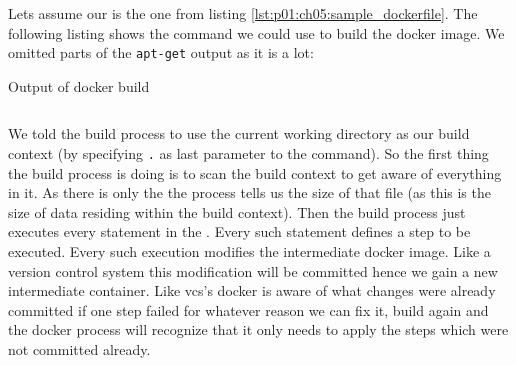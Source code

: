			Lets assume our \dockerfile{} is the one from listing \ref{lst:p01:ch05:sample_dockerfile}. The following listing shows the command we could use to build the docker image. We omitted parts of the \texttt{apt-get} output as it is a lot:
			\begin{listing}[H]
				\caption{Output of docker build}
				\label{lst:p01:ch05:docker_build}
				\inputminted{text}{\relative{chapter_04/section_5.1.2/docker_build.lst}}
			\end{listing}
			We told the build process to use the current working directory as our build context (by specifying \texttt{.} as last parameter to the command). So the first thing the build process is doing is to scan the build context to get aware of everything in it. As there is only the \dockerfile{} the process tells us the size of that file (as this is the size of data residing within the build context). Then the build process just executes every statement in the \dockerfile{}. Every such statement defines a step to be executed. Every such execution modifies the intermediate docker image. Like a version control system this modification will be committed hence we gain a new intermediate container. Like vcs's docker is aware of what changes were already committed if one step failed for whatever reason we can fix it, build again and the docker process will recognize that it only needs to apply the steps which were not committed already.
			
